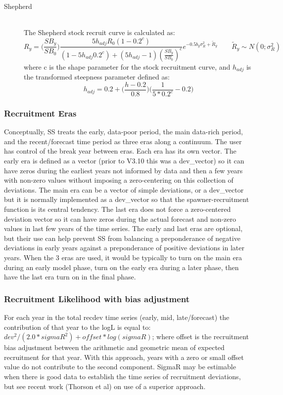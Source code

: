 \begin{description}
	\item[Shepherd]\hfil\\
	\hypertarget{Shepherd}{The} Shepherd stock recruit curve is calculated as:
	\begin{equation}
		R_y = \bigg(\frac{SB_y}{SB_0}\bigg)\frac{5h_{adj}R_0(1-0.2^c)}{(1-5h_{adj}0.2^c)+(5h_{adj}-1)(\frac{SB_y}{SB_0})^c}e^{-0.5b_y\sigma^2_R+\tilde{R}_y}\qquad \tilde{R}_y\sim N(0;\sigma^2_R)
	\end{equation}
	where c is the shape parameter for the stock recruitment curve, and $h_{adj}$ is the transformed steepness parameter defined as:
	\begin{equation}
		h_{adj}=0.2+\bigg(\frac{h-0.2}{0.8}\bigg)\bigg(\frac{1}{5*0.2^c}-0.2\bigg)
	\end{equation}
\end{description}

\subsubsection{Recruitment Eras}
Conceptually, SS treats the early, data-poor period, the main data-rich period, and the recent/forecast time period as three eras along a continuum.  The user has control of the break year between eras.  Each era has its own vector.  The early era is defined as a vector (prior to V3.10 this was a dev\_vector) so it can have zeros during the earliest years not informed by data and then a few years with non-zero values without imposing a zero-centering on this collection of deviations.  The main era can be a vector of simple deviations, or a dev\_vector but it is normally implemented as a dev\_vector so that the spawner-recruitment function is its central tendency.  The last era does not force a zero-centered deviation vector so it can have zeros during the actual forecast and non-zero values in last few years of the time series.  The early and last eras are optional, but their use can help prevent SS from balancing a preponderance of negative deviations in early years against a preponderance of positive deviations in later years.  When the 3 eras are used, it would be typically to turn on the main era during an early model phase, turn on the early era during a later phase, then have the last era turn on in the final phase.

\subsubsection{Recruitment Likelihood with bias adjustment}
For each year in the total recdev time series (early, mid, late/forecast) the contribution of that year to the logL is equal to:  $dev^2/(2.0*sigmaR^2)+offset*log(sigmaR)$; where offset is the recruitment bias adjustment between the arithmetic and geometric mean of expected recruitment for that year.  With this approach, years with a zero or small offset value do not contribute to the second component. SigmaR may be estimable when there is good data to establish the time series of recruitment deviations, but see recent work (Thorson et al) on use of a superior approach.

